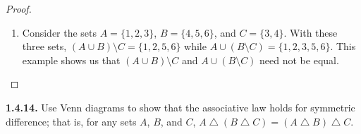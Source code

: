 \documentclass[12pt]{amsart}
\newenvironment{statement}[1]{\smallskip\noindent\color[rgb]{.6627, .3529, .6314} {\bf #1.}}{}
\theoremstyle{definition}
\theoremstyle{remark}
\begin{document}
\begin{proof}
\begin{enumerate}
	\item Consider the sets $A = \{ 1, 2, 3 \}$, $B = \{ 4, 5, 6 \}$, and $C = \{ 3, 4 \}$.
	With these three sets, $(A \cup B) \setminus C = \{ 1, 2, 5, 6 \}$ while $A \cup (B \setminus C) = \{ 1, 2, 3, 5, 6 \}$.
	This example shows us that $(A \cup B) \setminus C$ and $A \cup (B \setminus C)$ need not be equal.
\end{enumerate}
\end{proof}


\begin{statement}{1.4.14}
Use Venn diagrams to show that the associative law holds for symmetric difference;
that is, for any sets $A$, $B$, and $C$, $A \bigtriangleup (B \bigtriangleup C) = (A \bigtriangleup B) \bigtriangleup C$.
\end{statement}
\end{document}
